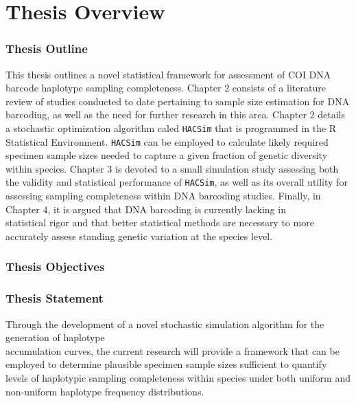 \linespread{1.0}

\chapter{Thesis Overview}
\subsection{Thesis Outline} \label{sec:intro1}

This thesis outlines a novel statistical framework for assessment of COI DNA barcode haplotype sampling completeness. Chapter 2 consists of a literature review of studies conducted to date pertaining to sample size estimation for DNA barcoding, as well as the need for further research in this area. Chapter 2 details a stochastic optimization algorithm caled {\tt HACSim} that is programmed in the R Statistical Environment. {\tt HACSim} can be employed to calculate likely required specimen sample sizes needed to capture a given fraction of genetic diversity within species. Chapter 3 is devoted to a small simulation study assessing both the validity and statistical performance of {\tt HACSim}, as well as its overall utility for assessing sampling completeness within DNA barcoding studies. Finally, in Chapter 4, it is argued that DNA barcoding is currently lacking in \\ statistical rigor and that better statistical methods are necessary to more accurately assess standing genetic variation at the species level.


\subsection{Thesis Objectives}


\subsection{Thesis Statement}

Through the development of a novel stochastic simulation algorithm for the generation of haplotype \\ accumulation curves, the current research will provide a framework that can be employed to determine plausible specimen sample sizes sufficient to quantify levels of haplotypic sampling completeness within species under both uniform and non-uniform haplotype frequency distributions.



  
